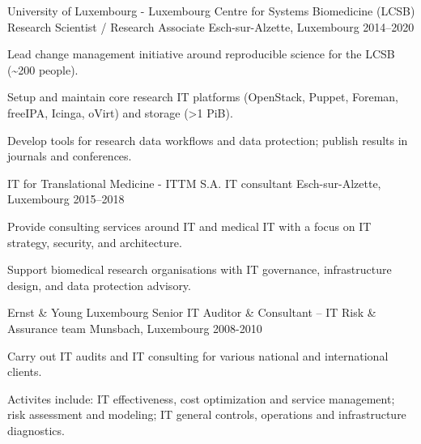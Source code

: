 \begin{cventries}
  \cventry
    {University of Luxembourg - Luxembourg Centre for Systems Biomedicine (LCSB)} %
    {Research Scientist / Research Associate} %
    {Esch-sur-Alzette, Luxembourg} %
    {2014--2020} %
    {
      \begin{cvitems} %
        \item {Lead change management initiative around reproducible science for the LCSB (\textasciitilde 200 people).}
        \item {Setup and maintain core research IT platforms (OpenStack, Puppet, Foreman, freeIPA, Icinga, oVirt) and storage (\textgreater 1 PiB).}
        \item {Develop tools for research data workflows and data protection; publish results in journals and conferences.}
      \end{cvitems}
    }

  \cventry
    {IT for Translational Medicine - ITTM S.A.}
    {IT consultant}
    {Esch-sur-Alzette, Luxembourg}
    {2015--2018}
    {
      \begin{cvitems}
        \item {Provide consulting services around IT and medical IT with a focus on IT strategy, security, and architecture.}
        \item {Support biomedical research organisations with IT governance, infrastructure design, and data protection advisory.}
      \end{cvitems}
    }

  \cventry
    {Ernst \& Young Luxembourg} %
    {Senior IT Auditor \& Consultant -- IT Risk \& Assurance team} %
    {Munsbach, Luxembourg} %
    {2008-2010} %
    {
      \begin{cvitems} %
        \item {Carry out IT audits and IT consulting for various national and international clients.}
        \item {Activites include: IT effectiveness, cost optimization and service management; risk assessment and modeling; IT general controls, operations and infrastructure diagnostics.}
      \end{cvitems}
    }
\end{cventries}
